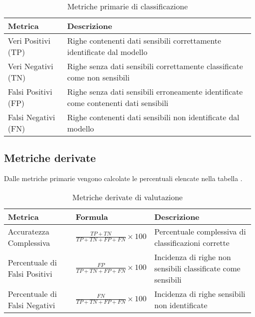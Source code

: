 \documentclass[12pt]{report}
\begin{document}
\begin{table}[h!]
    \centering
    \begin{tabular}{|p{}|p{}|}
        \hline
        \textbf{Metrica} & \textbf{Descrizione} \\
        \hline
        Veri Positivi (TP) & Righe contenenti dati sensibili correttamente identificate dal modello \\
        \hline
        Veri Negativi (TN) & Righe senza dati sensibili correttamente classificate come non sensibili \\
        \hline
        Falsi Positivi (FP) & Righe senza dati sensibili erroneamente identificate come contenenti dati sensibili \\
        \hline
        Falsi Negativi (FN) & Righe contenenti dati sensibili non identificate dal modello \\
        \hline
    \end{tabular}
    \caption{Metriche primarie di classificazione}
    \label{tab:metriche_primarie}
\end{table}

\subsection{Metriche derivate}
\label{subsec:metriche_derivate}

Dalle metriche primarie vengono calcolate le percentuali elencate nella tabella .

\begin{table}[h!]
    \centering
    \begin{tabular}{|p{}|p{}|p{}|}
        \hline
        \textbf{Metrica} & \textbf{Formula} & \textbf{Descrizione} \\
        \hline
        Accuratezza Complessiva & $\frac{TP + TN}{TP + TN + FP + FN} \times 100$ & Percentuale complessiva di classificazioni corrette \\
        \hline
        Percentuale di Falsi Positivi & $\frac{FP}{TP + TN + FP + FN} \times 100$ & Incidenza di righe non sensibili classificate come sensibili \\
        \hline
        Percentuale di Falsi Negativi & $\frac{FN}{TP + TN + FP + FN} \times 100$ & Incidenza di righe sensibili non identificate \\
        \hline
    \end{tabular}
    \caption{Metriche derivate di valutazione}
    \label{tab:metriche_derivate}
\end{table}
\end{document}
